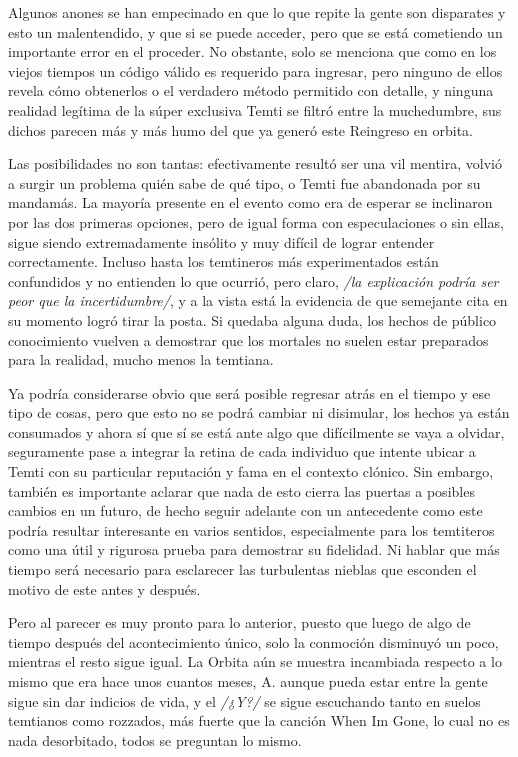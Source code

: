 \documentclass[
  spanish,
]{book}
\begin{document}
Algunos anones se han empecinado en que lo que repite la gente son disparates y esto un malentendido, y que si se puede acceder, pero que se está cometiendo un importante error en el proceder. No obstante, solo se menciona que como en los viejos tiempos un código válido es requerido para ingresar, pero ninguno de ellos revela cómo obtenerlos o el verdadero método permitido con detalle, y ninguna realidad legítima de la súper exclusiva Temti se filtró entre la muchedumbre, sus dichos parecen más y más humo del que ya generó este Reingreso en orbita.

Las posibilidades no son tantas: efectivamente resultó ser una vil mentira, volvió a surgir un problema quién sabe de qué tipo, o Temti fue abandonada por su mandamás. La mayoría presente en el evento como era de esperar se inclinaron por las dos primeras opciones, pero de igual forma con especulaciones o sin ellas, sigue siendo extremadamente insólito y muy difícil de lograr entender correctamente. Incluso hasta los temtineros más experimentados están confundidos y no entienden lo que ocurrió, pero claro, \emph{/la explicación podría ser peor que la incertidumbre/}, y a la vista está la evidencia de que semejante cita en su momento logró tirar la posta. Si quedaba alguna duda, los hechos de público conocimiento vuelven a demostrar que los mortales no suelen estar preparados para la realidad, mucho menos la temtiana.

Ya podría considerarse obvio que será posible regresar atrás en el tiempo y ese tipo de cosas, pero que esto no se podrá cambiar ni disimular, los hechos ya están consumados y ahora sí que sí se está ante algo que difícilmente se vaya a olvidar, seguramente pase a integrar la retina de cada individuo que intente ubicar a Temti con su particular reputación y fama en el contexto clónico. Sin embargo, también es importante aclarar que nada de esto cierra las puertas a posibles cambios en un futuro, de hecho seguir adelante con un antecedente como este podría resultar interesante en varios sentidos, especialmente para los temtiteros como una útil y rigurosa prueba para demostrar su fidelidad. Ni hablar que más tiempo será necesario para esclarecer las turbulentas nieblas que esconden el motivo de este antes y después.

Pero al parecer es muy pronto para lo anterior, puesto que luego de algo de tiempo después del acontecimiento único, solo la conmoción disminuyó un poco, mientras el resto sigue igual. La Orbita aún se muestra incambiada respecto a lo mismo que era hace unos cuantos meses, A. aunque pueda estar entre la gente sigue sin dar indicios de vida, y el \emph{/¿Y?/} se sigue escuchando tanto en suelos temtianos como rozzados, más fuerte que la canción When Im Gone, lo cual no es nada desorbitado, todos se preguntan lo mismo.
\end{document}
